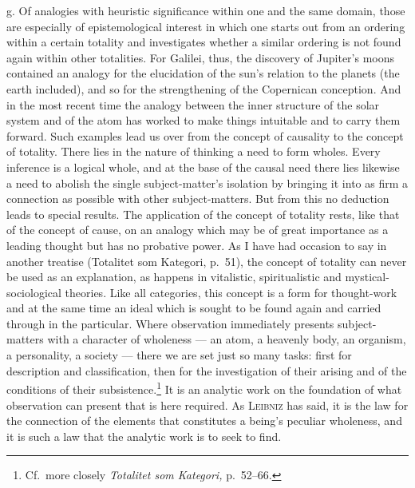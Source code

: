 \documentclass[12pt]{book}
\newcommand{\opage}[1]{\marginnote{\footnotesize\textit{[#1]}}}
\begin{document}
g. Of analogies with heuristic significance within one and the same domain, those
are especially of epistemological interest in which one starts out from an
ordering within a certain totality and investigates whether a similar ordering is
not found again within other totalities. For Galilei, thus, the discovery of
Jupiter's moons contained an analogy for the elucidation of the sun's relation to
the planets (the earth included), and so for the strengthening of the Copernican
conception. And in the most recent time the analogy between the inner structure
of the solar system and of the atom has worked to make things intuitable and to
carry them forward. Such examples lead us over from the concept of causality to
the concept of totality. There lies in the nature of thinking a need to form
wholes. Every inference is a logical whole, and at the base of the causal need
there lies likewise a need to abolish the single subject-matter's \opage{103}isolation by
bringing it into as firm a connection as possible with other subject-matters. But
from this no deduction leads to special results. The application of the concept of
totality rests, like that of the concept of cause, on an analogy which may be of
great importance as a leading thought but has no probative power. As I have had
occasion to say in another treatise (Totalitet som Kategori, p.\ 51), the concept
of totality can never be used as an explanation, as happens in vitalistic,
spiritualistic and mystical-sociological theories. Like all categories, this
concept is a form for thought-work and at the same time an ideal which is sought
to be found again and carried through in the particular. Where observation
immediately presents subject-matters with a character of wholeness --- an atom, a
heavenly body, an organism, a personality, a society --- there we are set just so
many tasks: first for description and classification, then for the investigation
of their arising and of the conditions of their
subsistence.\footnote{Cf.\ more closely \textit{Totalitet som Kategori,} p.\
52--66.} It is an analytic work on the foundation of what observation can present
that is here required. As \textsc{Leibniz} has said, it is the law for the
connection of the elements that constitutes a being's peculiar wholeness, and it
is such a law that the analytic work is to seek to find.
\end{document}
